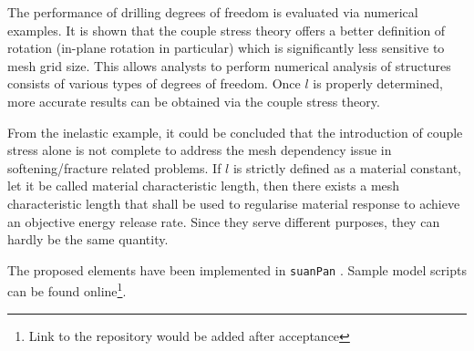 \documentclass[3p,sort&compress,11pt,fleqn]{elsarticle}
\begin{document}
The performance of drilling degrees of freedom is evaluated via numerical examples. It is shown that the couple stress theory offers a better definition of rotation (in-plane rotation in particular) which is significantly less sensitive to mesh grid size. This allows analysts to perform numerical analysis of structures consists of various types of degrees of freedom. Once $l$ is properly determined, more accurate results can be obtained via the couple stress theory.

From the inelastic example, it could be concluded that the introduction of couple stress alone is not complete to address the mesh dependency issue in softening/fracture related problems. If $l$ is strictly defined as a material constant, let it be called material characteristic length, then there exists a mesh characteristic length that shall be used to regularise material response to achieve an objective energy release rate. Since they serve different purposes, they can hardly be the same quantity.

The proposed elements have been implemented in \texttt{suanPan} \citep{Chang2021}. Sample model scripts can be found online\footnote{Link to the repository would be added after acceptance}.


\end{document}
